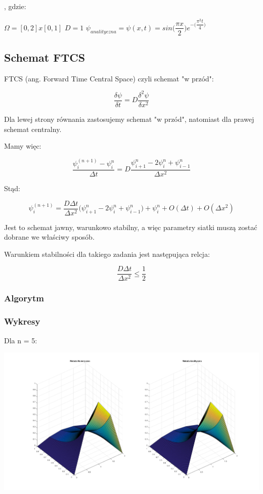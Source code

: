 , gdzie:

$\Omega = [0,2]x[0,1]$
\newline
$D=1$
\newline
\vspace{0.2cm}
$\psi_{analityczna}=\psi(x,t)=sin\Big(\dfrac{\pi x}{2}\Big)e^{-\Big(\dfrac{\pi^2 t}{4}\Big)}$

\subsection{Schemat FTCS}

FTCS (ang. Forward Time Central Space) czyli schemat "w przód":

$$\dfrac{\delta \psi}{\delta t} = D\dfrac{\delta^2 \psi}{\delta x^2}$$

Dla lewej strony równania zastosujemy schemat "w przód", natomiast dla prawej schemat centralny.

Mamy więc:

$$\dfrac{\psi^{(n+1)}_{i}-\psi^n_{i}}{\Delta t}=D\dfrac{\psi^{n}_{i+1}-2\psi^n_{i}+\psi^n_{i-1}}{\Delta x^2}$$

Stąd:

$$\psi^{(n+1)}_{i}=\dfrac{D\Delta t}{\Delta x^2}\Big(\psi^{n}_{i+1}-2\psi^{n}_{i}+\psi^{n}_{i-1}\Big)+\psi^{n}_{i} + O(\Delta t)+O(\Delta x^2)$$

Jest to schemat jawny, warunkowo stabilny, a więc parametry siatki muszą zostać dobrane we właściwy sposób.

Warunkiem stabilności dla takiego zadania jest następująca relcja:

$$\dfrac{D\Delta t}{\Delta x^2}\le \dfrac{1}{2}$$
\newpage
\subsubsection{Algorytm}


\newpage
\subsubsection{Wykresy}

Dla n = 5:

{\centering
	
	\includegraphics{Lab7/charts/ftcs/5.png}
	
}

